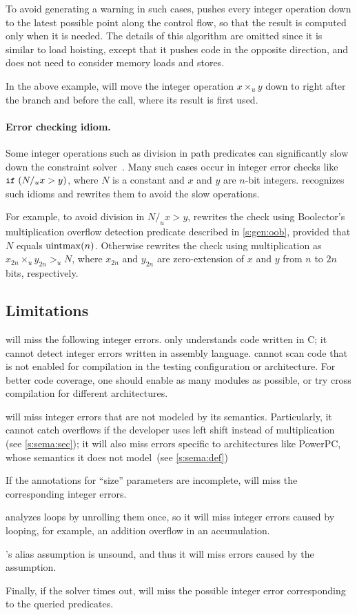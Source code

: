 To avoid generating a warning in such cases, \sys pushes every
integer operation down to the latest possible point along the control
flow, so that the result is computed only when it is needed.  The
details of this algorithm are omitted since it is similar to load
hoisting, except that it pushes code in the opposite direction, and
does not need to consider memory loads and stores.

In the above example, \sys will move the integer operation $x
\times_u y$ down to right after the  branch and before the
 call, where its result  is first used.

\paragraph{Error checking idiom.}

Some integer operations such as division in path predicates can
significantly slow down the constraint solver~\cite{brummayer:perf}.
Many such cases occur in integer error checks like $\cc{if}\ (N /_u
x > y)$, where $N$ is a constant and $x$ and $y$ are $n$-bit integers.
\sys recognizes such idioms and rewrites them to avoid the slow
operations.

For example, to avoid division in $N /_u x > y$, \sys rewrites the check using
Boolector's multiplication overflow detection predicate described
in \autoref{s:gen:oob}, provided that $N$ equals $\operatorname{uintmax}(n)$.
Otherwise \sys rewrites the check using multiplication as $x_{2n}
\times_u y_{2n} >_u N$, where $x_{2n}$ and $y_{2n}$ are zero-extension
of $x$ and $y$ from $n$ to $2n$ bits, respectively.
%

\subsection{Limitations}
\label{s:gen:limit}

\sys will miss the following integer errors.
%
\sys only understands code written in C; it cannot detect integer
errors written in assembly language.
%
\sys cannot scan code that is not enabled for compilation in the
testing configuration or architecture.  For better code coverage,
one should enable as many modules as possible, or try cross compilation
for different architectures.

\sys will miss integer errors
that are not modeled by its semantics.  Particularly, it cannot catch
overflows if the developer uses left shift instead of multiplication
(see \autoref{s:sema:sec});
it will also miss errors specific to architectures like PowerPC,
whose semantics it does not model~(see \autoref{s:sema:def})

If the annotations for ``size'' parameters are incomplete, \sys will
miss the corresponding integer errors.

\sys analyzes loops by unrolling them once, so it will miss integer
errors caused by looping, for example, an addition overflow in an
accumulation.

\sys's alias assumption is unsound, and thus it will miss errors
caused by the assumption.

Finally, if the solver times out, \sys will miss the possible integer
error corresponding to the queried predicates.
